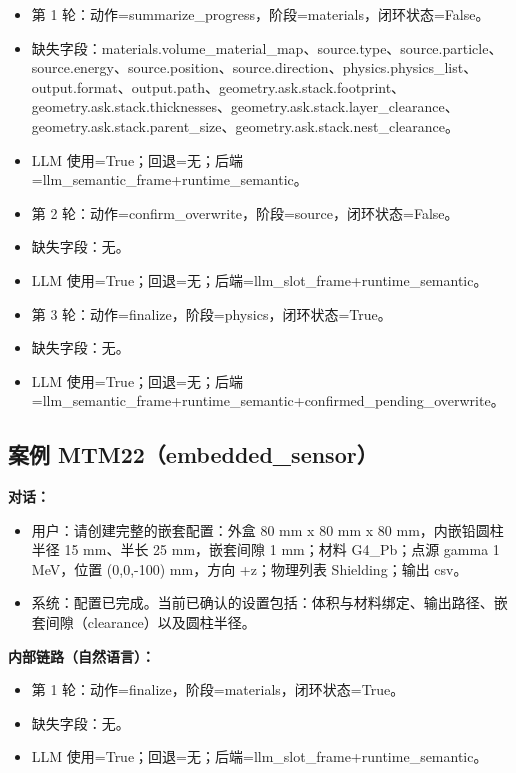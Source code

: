 \documentclass[11pt]{ctexart}
\begin{document}
\begin{itemize}
\item 第 1 轮：动作=summarize\_progress，阶段=materials，闭环状态=False。
\item 缺失字段：materials.volume\_material\_map、source.type、source.particle、source.energy、source.position、source.direction、physics.physics\_list、output.format、output.path、geometry.ask.stack.footprint、geometry.ask.stack.thicknesses、geometry.ask.stack.layer\_clearance、geometry.ask.stack.parent\_size、geometry.ask.stack.nest\_clearance。
\item LLM 使用=True；回退=无；后端=llm\_semantic\_frame+runtime\_semantic。
\item 第 2 轮：动作=confirm\_overwrite，阶段=source，闭环状态=False。
\item 缺失字段：无。
\item LLM 使用=True；回退=无；后端=llm\_slot\_frame+runtime\_semantic。
\item 第 3 轮：动作=finalize，阶段=physics，闭环状态=True。
\item 缺失字段：无。
\item LLM 使用=True；回退=无；后端=llm\_semantic\_frame+runtime\_semantic+confirmed\_pending\_overwrite。
\end{itemize}
\subsection{案例 MTM22（embedded\_sensor）}
\textbf{对话：}
\begin{itemize}
\item 用户：请创建完整的嵌套配置：外盒 80 mm x 80 mm x 80 mm，内嵌铅圆柱半径 15 mm、半长 25 mm，嵌套间隙 1 mm；材料 G4\_Pb；点源 gamma 1 MeV，位置 (0,0,-100) mm，方向 +z；物理列表 Shielding；输出 csv。
\item 系统：配置已完成。当前已确认的设置包括：体积与材料绑定、输出路径、嵌套间隙（clearance）以及圆柱半径。
\end{itemize}
\textbf{内部链路（自然语言）：}
\begin{itemize}
\item 第 1 轮：动作=finalize，阶段=materials，闭环状态=True。
\item 缺失字段：无。
\item LLM 使用=True；回退=无；后端=llm\_slot\_frame+runtime\_semantic。
\end{itemize}
\end{document}
